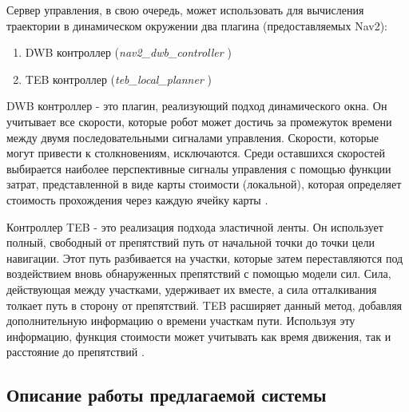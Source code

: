 Сервер управления, в свою очередь, может использовать для вычисления траектории в динамическом окружении два плагина (предоставляемых Nav2):
\begin{enumerate}
    \item DWB контроллер (\textit{nav2\_dwb\_controller} \cite{nav2-dwb})
    \item TEB контроллер (\textit{teb\_local\_planner} \cite{teb-planner})
\end{enumerate}

DWB контроллер - это плагин, реализующий подход динамического окна. Он учитывает все скорости, которые робот может достичь за промежуток времени между двумя последовательными сигналами управления. Скорости, которые могут привести к столкновениям, исключаются. Среди оставшихся скоростей выбирается наиболее перспективные сигналы управления с помощью функции затрат, представленной в виде карты стоимости (локальной), которая определяет стоимость прохождения через каждую ячейку карты \cite{dwa}.

Контроллер TEB - это реализация подхода эластичной ленты. Он использует полный, свободный от препятствий путь от начальной точки до точки цели навигации. Этот путь разбивается на участки, которые затем переставляются под воздействием вновь обнаруженных препятствий с помощью модели сил. Сила, действующая между участками, удерживает их вместе, а сила отталкивания толкает путь в сторону от препятствий. TEB расширяет данный метод, добавляя дополнительную информацию о времени участкам пути. Используя эту информацию, функция стоимости может учитывать как время движения, так и расстояние до препятствий \cite{teb-info}.

\subsection{Описание работы предлагаемой системы}

